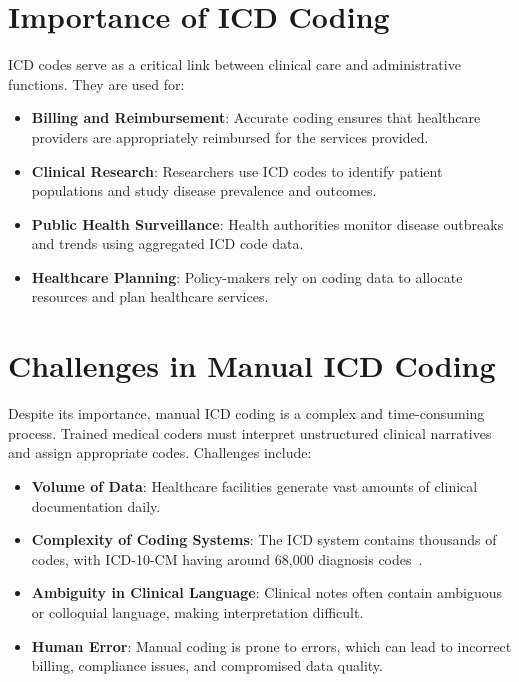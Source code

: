 \documentclass[12pt,a4paper]{report}
\begin{document}
\section{Importance of ICD Coding}
ICD codes serve as a critical link between clinical care and administrative functions. They are used for:
\begin{itemize}
    \item \textbf{Billing and Reimbursement}: Accurate coding ensures that healthcare providers are appropriately reimbursed for the services provided.
    \item \textbf{Clinical Research}: Researchers use ICD codes to identify patient populations and study disease prevalence and outcomes.
    \item \textbf{Public Health Surveillance}: Health authorities monitor disease outbreaks and trends using aggregated ICD code data.
    \item \textbf{Healthcare Planning}: Policy-makers rely on coding data to allocate resources and plan healthcare services.
\end{itemize}

\section{Challenges in Manual ICD Coding}
Despite its importance, manual ICD coding is a complex and time-consuming process. Trained medical coders must interpret unstructured clinical narratives and assign appropriate codes. Challenges include:
\begin{itemize}
    \item \textbf{Volume of Data}: Healthcare facilities generate vast amounts of clinical documentation daily.
    \item \textbf{Complexity of Coding Systems}: The ICD system contains thousands of codes, with ICD-10-CM having around 68,000 diagnosis codes~\cite{dong2022automated}.
    \item \textbf{Ambiguity in Clinical Language}: Clinical notes often contain ambiguous or colloquial language, making interpretation difficult.
    \item \textbf{Human Error}: Manual coding is prone to errors, which can lead to incorrect billing, compliance issues, and compromised data quality.
\end{itemize}
\end{document}
